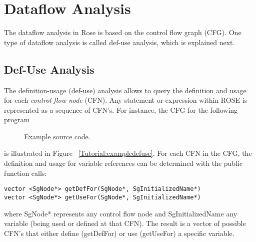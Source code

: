 \chapter{Dataflow Analysis}

The dataflow analysis in Rose is based on the control flow graph (CFG).
One type of dataflow analysis is called def-use analysis, which is explained next.

\section{Def-Use Analysis}

The definition-usage (def-use) analysis allows to query the definition
and usage for each \emph{control flow node} (CFN).
Any statement or expression within ROSE is represented as a sequence of CFN's.
For instance, the CFG for the following program



\begin{figure}[!h]
{\indent
{\mySmallFontSize


\begin{latexonly}
   
\end{latexonly}

\begin{htmlonly}
   
\end{htmlonly}

}
}
\caption{Example source code.}
\label{Tutorial:exampledefuseCode}
\end{figure}

is illustrated in Figure ~\ref{Tutorial:exampledefuse}.
For each CFN in the CFG, the definition and usage for 
variable references can be determined with the public function calls:

\begin{verbatim}
vector <SgNode*> getDefFor(SgNode*, SgInitializedName*)
vector <SgNode*> getUseFor(SgNode*, SgInitializedName*)
\end{verbatim}

where SgNode* represents any control flow node and SgInitializedName any variable (being
used or defined at that CFN). The result is a vector of possible CFN's that either
define (getDefFor) or use (getUseFor) a specific variable.

